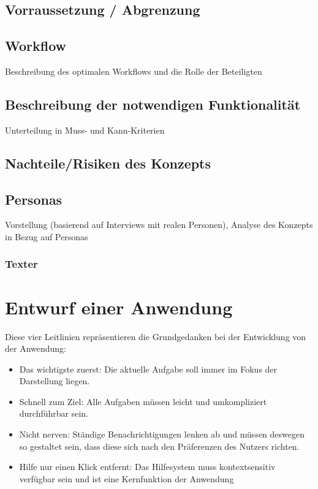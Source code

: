 \documentclass[11pt,a4paper]{article}
\begin{document}
\subsection{Vorraussetzung / Abgrenzung}

\subsection{Workflow}

Beschreibung des optimalen Workflows und die Rolle der Beteiligten

\subsection{Beschreibung der notwendigen Funktionalität}

Unterteilung in Muss- und Kann-Kriterien

\subsection{Nachteile/Risiken des Konzepts}

\subsection{Personas}

Vorstellung (basierend auf Interviews mit realen Personen), Analyse des Konzepts in Bezug auf Personas

\subsubsection{Texter}

\section{Entwurf einer Anwendung}

Diese vier Leitlinien repräsentieren die Grundgedanken bei der Entwicklung von der Anwendung:

\begin{itemize}
\item{Das wichtigste zuerst: Die aktuelle Aufgabe soll immer im Fokus der Darstellung liegen.}
\item{Schnell zum Ziel: Alle Aufgaben müssen leicht und umkompliziert durchführbar sein.}
\item{Nicht nerven: Ständige Benachrichtigungen lenken ab und müssen deswegen so gestaltet sein, dass diese sich nach den Präferenzen des Nutzers richten.}
\item{Hilfe nur einen Klick entfernt: Das Hilfesystem muss kontextsensitiv verfügbar sein und ist eine Kernfunktion der Anwendung}
\end{itemize}
\end{document}
